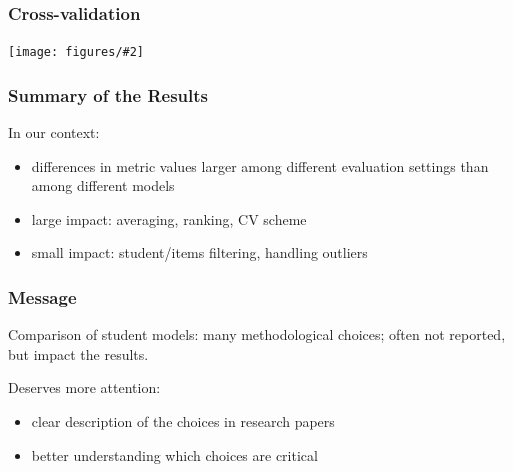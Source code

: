 \documentclass[bigger]{beamer}
\newcommand{\img}[2]{
  \begin{center}
    \texttt{[image: figures/\#2]}
  \end{center}
}
\begin{document}
\begin{frame}
  \frametitle{Cross-validation}
  \img{1.0}{cv--turtle}

\end{frame}

\begin{frame}
  \frametitle{Summary of the Results}

  In our context:
  \begin{itemize}
  \item differences in metric values larger among different evaluation settings
        than among different models
  \item large impact: averaging, ranking, CV scheme
  \item small impact: student/items filtering, handling outliers
  \end{itemize}

\end{frame}


\begin{frame}
  \frametitle{Message}

  Comparison of student models: many methodological choices; often not
  reported, but impact the results.

  \bigskip
  Deserves more attention:
  \begin{itemize}
  \item clear description of the choices in research papers
  \item better understanding which choices are critical
  \end{itemize}

\end{frame}
\end{document}
